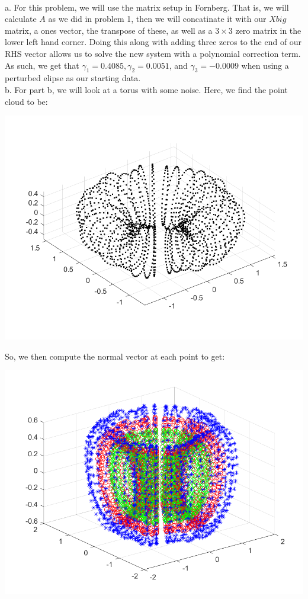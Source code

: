 \begin{solution}\renewcommand{\qedsymbol}{}\ \\

    a. For this problem, we will use the matrix setup in Fornberg. That is, we will calculate $A$ as we
    did in problem 1, then we will concatinate it with our $Xbig$ matrix, a ones vector, the transpose
    of these, as well as a $3\times3$ zero matrix in the lower left hand corner. Doing this along with
    adding three zeros to the end of our RHS vector allows us to solve the new system with a
    polynomial correction term. As such, we get that $\gamma_1=0.4085, \gamma_2=0.0051$, and
    $\gamma_3=-0.0009$ when using a perturbed elipse as our starting data.\\

    b. For part b, we will look at a torus with some noise. Here, we find the point cloud to be:

    \begin{center}
        \includegraphics[scale=0.5]{problem2bcloud.PNG}
    \end{center}

    So, we then compute the normal vector at each point to get:
    
    \begin{center}
        \includegraphics[scale=0.7]{problem2bnorm.PNG}
    \end{center}


\end{solution}
